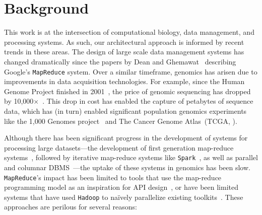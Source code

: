 \documentclass[masters]{ucbthesis}
\begin{document}
\section{Background}
\label{sec:background}

This work is at the intersection of computational biology, data management, and processing
systems. As such, our architectural approach is informed by recent trends in these areas. The design of
large scale data management systems has changed dramatically since the papers by Dean and
Ghemawat~\cite{dean04, dean08} describing Google's \texttt{MapReduce} system. Over a
similar timeframe, genomics has arisen due to improvements in data acquisition technologies. For
example, since the Human Genome Project finished in 2001~\cite{lander01}, the price of genomic
sequencing has dropped by 10,000$\times$~\cite{nhgri}. This drop in cost has enabled the capture of
petabytes of sequence data, which has (in turn) enabled significant population genomics experiments like 
the 1,000 Genomes project~\cite{siva08} and The Cancer Genome Atlas~(TCGA, \cite{weinstein13}).

Although there has been significant progress in the development of systems for processing large
datasets---the development of first generation map-reduce systems~\cite{dean04}, followed by
iterative map-reduce systems like \texttt{Spark}~\cite{zaharia10}, as well as parallel and columnar
DBMS~\cite{abadi06, lamb12}---the uptake of these systems in genomics has been slow.
\texttt{MapReduce}'s impact has been limited to tools that use the map-reduce programming model as an
inspiration for API design~\cite{mckenna10}, or have been limited systems that have used \texttt{Hadoop}
to na\"{i}vely parallelize existing toolkits~\cite{langmead09, schatz09}. These approaches are perilous for
several reasons:
\end{document}
